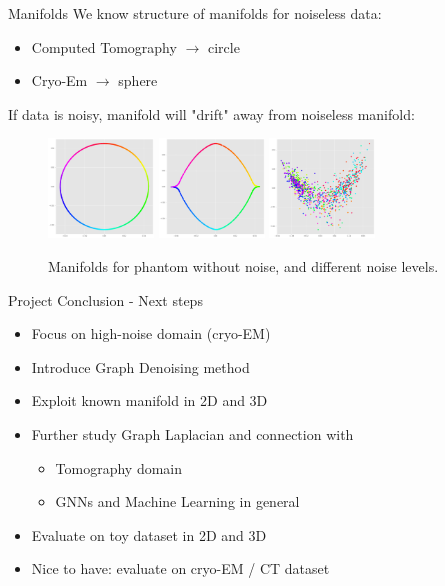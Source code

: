 \documentclass[aspectratio=169]{beamer}
\begin{document}
\begin{frame}[c]{Manifolds}
    We know structure of manifolds for noiseless data:
    \begin{itemize}
        \item Computed Tomography $\to$ circle
        \item Cryo-Em $\to$ sphere
    \end{itemize}

    If data is noisy, manifold will "drift" away from noiseless manifold:
    \begin{figure}
        \includegraphics[width=0.25\textwidth]{phantom_second_third_evec}
        \includegraphics[width=0.25\textwidth]{phantom_second_third_evec_noisy}
        \includegraphics[width=0.25\textwidth]{phantom_second_third_evec_noisy_high}
        \caption{Manifolds for phantom without noise, and different noise levels.}
    \end{figure}
\end{frame}


\begin{frame}{Project Conclusion - Next steps}
    \begin{itemize}
        \item Focus on high-noise domain (cryo-EM)
        \item Introduce Graph Denoising method
        \item Exploit known manifold in 2D and 3D
        \item Further study Graph Laplacian and connection with
            \begin{itemize}
                \item Tomography domain
                \item GNNs and Machine Learning in general
            \end{itemize}
        \item Evaluate on toy dataset in 2D and 3D
        \item Nice to have: evaluate on cryo-EM / CT dataset
    \end{itemize}
\end{frame}
\end{document}
